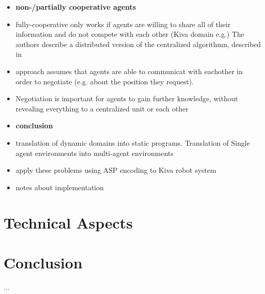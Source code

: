 \documentclass[runningheads]{llncs}
\begin{document}
\begin{itemize}
    \item \textbf{non-/partially cooperative agents}
    \item fully-cooperative only works if agents are willing to share all of their information and do not compete with each other (Kiva domain e.g.)
    \itme The authors describe a distributed version of the centralized algorithmn, described in \cite{son2009logic}
    \item approach assumes that agents are able to communicat with eachother in order to negotiate (e.g. about the position they request). 
    \item Negotiation is important for agents to gain further knowledge, without revealing everything to a centralized unit or each other
    \item \textbf{conclusion}
    \item translation of dynamic domains into static programs. Translation of Single agent environments into multi-agent environments
    \item apply these problems using ASP encoding to Kiva robot system
    \item notes about implementation
\end{itemize}

\section{Technical Aspects} \label{sec:ta}



\section{Conclusion} \label{sec:conclusion}

...




\end{document}
